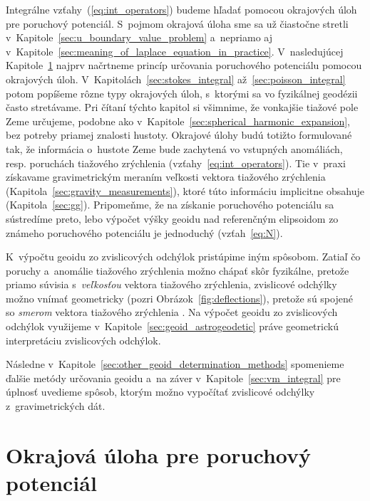 \documentclass[a4paper,12pt]{book}
\begin{document}
Integrálne vzťahy~(\ref{eq:int_operators}) budeme hľadať pomocou okrajových 
úloh pre poruchový potenciál.  S~pojmom okrajová úloha sme sa už čiastočne 
stretli v~Kapitole~\ref{sec:u_boundary_value_problem} a~nepriamo aj 
v~Kapitole~\ref{sec:meaning_of_laplace_equation_in_practice}.  V~nasledujúcej 
Kapitole~\ref{sec:boundary_value_problem} najprv načrtneme princíp určovania 
poruchového potenciálu pomocou okrajových úloh.  
V~Kapitolách~\ref{sec:stokes_integral} až~\ref{sec:poisson_integral} potom 
popíšeme rôzne typy okrajových úloh, s~ktorými sa vo fyzikálnej geodézii často 
stretávame.  Pri čítaní týchto kapitol si všimnime, že vonkajšie tiažové pole 
Zeme určujeme, podobne ako v~Kapitole~\ref{sec:spherical_harmonic_expansion}, 
bez potreby priamej znalosti hustoty.  Okrajové úlohy budú totižto formulované 
tak, že informácia o~hustote Zeme bude zachytená vo vstupných anomáliách, 
resp. poruchách tiažového zrýchlenia (vzťahy~\ref{eq:int_operators}).  Tie 
v~praxi získavame gravimetrickým meraním veľkosti vektora tiažového zrýchlenia 
(Kapitola~\ref{sec:gravity_measurements}), ktoré túto informáciu implicitne 
obsahuje (Kapitola~\ref{sec:gg}).  Pripomeňme, že na získanie poruchového 
potenciálu sa sústredíme preto, lebo výpočet výšky geoidu nad referenčným 
elipsoidom zo známeho poruchového potenciálu je jednoduchý (vzťah~\ref{eq:N}).

K~výpočtu geoidu zo zvislicových odchýlok pristúpime iným spôsobom.  Zatiaľ čo 
poruchy a~anomálie tiažového zrýchlenia možno chápať skôr fyzikálne, pretože 
priamo súvisia s~\emph{veľkosťou} vektora tiažového zrýchlenia, zvislicové 
odchýlky možno vnímať geometricky (pozri Obrázok~\ref{fig:deflections}), 
pretože sú spojené so \emph{smerom} vektora tiažového zrýchlenia 
\parencite{MoritzPhysicalGeodesy}.  Na výpočet geoidu zo zvislicových odchýlok 
využijeme v~Kapitole~\ref{sec:geoid_astrogeodetic} práve geometrickú 
interpretáciu zvislicových odchýlok.

Následne v~Kapitole~\ref{sec:other_geoid_determination_methods} spomenieme 
ďalšie metódy určovania geoidu a~na záver v~Kapitole~\ref{sec:vm_integral} pre 
úplnosť uvedieme spôsob, ktorým možno vypočítať zvislicové odchýlky 
z~gravimetrických dát.


\section{Okrajová úloha pre poruchový potenciál}
\label{sec:boundary_value_problem}
\end{document}
